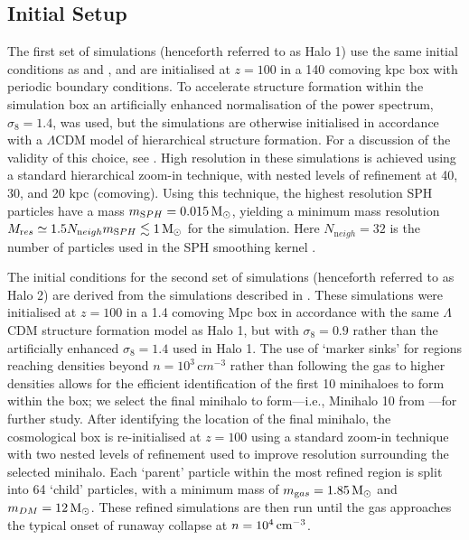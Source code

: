 \documentclass[../thesis.tex]{subfiles}
\begin{document}
\subsection{Initial Setup}
\label{setup}
The first set of simulations (henceforth referred to as Halo 1) use the same initial conditions as \citet{Hummeletal2015} and \citet{StacyGreifBromm2010}, and are initialised at $z=100$ in a 140 comoving kpc box with periodic boundary conditions. 
To accelerate structure formation within the simulation box an artificially enhanced normalisation of the power spectrum, $\sigma_8 = 1.4$, was used, but the simulations are otherwise initialised in accordance with a $\Lambda$CDM model of hierarchical structure formation. 
For a discussion of the validity of this choice, see \citet{StacyGreifBromm2010}. 
High resolution in these simulations is achieved using a standard hierarchical zoom-in technique, with nested levels of refinement at 40, 30, and 20 kpc (comoving).  
Using this technique, the highest resolution SPH particles have a mass $m_{\mathrm SPH} = 0.015\,\mathrm{M}_{\odot}$, yielding a minimum mass resolution $M_{\mathrm res} \simeq 1.5 N_{\mathrm neigh} m_{\mathrm SPH} \lesssim 1\,\mathrm{M}_{\odot}$ for the simulation.  
Here $N_{\mathrm neigh} = 32$ is the number of particles used in the SPH smoothing kernel \citep{BateBurkert1997}.

The initial conditions for the second set of simulations (henceforth referred to as Halo 2) are derived from the simulations described in \citet{StacyBromm2013}.  
These simulations were initialised at $z=100$ in a 1.4 comoving Mpc box in accordance with the same $\Lambda$CDM structure formation model as Halo 1, but with $\sigma_8 = 0.9$ rather than the artificially enhanced $\sigma_8 = 1.4$ used in Halo 1. 
The use of `marker sinks'  for regions reaching densities beyond $n=10^3\,{\mathrm cm}^{-3}$ rather than following the gas to higher densities allows for the efficient identification of the first 10 minihaloes to form within the box; we select the final minihalo to form---i.e., Minihalo 10 from \citet{StacyBromm2013}---for further study.  
After identifying the location of the final minihalo, the cosmological box is re-initialised at $z=100$ using a standard zoom-in technique with two nested levels of refinement used to improve resolution surrounding the selected minihalo.  
Each `parent' particle within the most refined region is split into 64 `child' particles, with a minimum mass of $m_{\mathrm gas}=1.85\,\mathrm{M}_{\odot}$ and $m_{\mathrm \small DM}=12\,\mathrm{M}_{\odot}$. 
These refined simulations are then run until the gas approaches the typical onset of runaway collapse at $n=10^4\,\mathrm{cm}^{-3}$.
\end{document}

